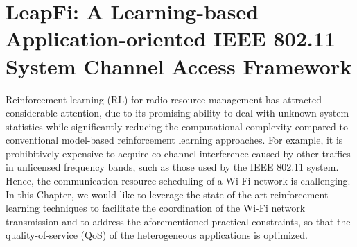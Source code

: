 \chapter{LeapFi: A Learning-based Application-oriented IEEE 802.11 System Channel Access Framework}
\label{ch3_after}


Reinforcement learning (RL) for radio resource management has attracted considerable attention, due to its promising ability to deal with unknown system statistics while significantly reducing the computational complexity compared to conventional model-based reinforcement learning approaches.
For example, it is prohibitively expensive to acquire co-channel interference caused by other traffics in unlicensed frequency bands, such as those used by the IEEE 802.11 system.
Hence, the communication resource scheduling of a Wi-Fi network is challenging.
In this Chapter, we would like to leverage the state-of-the-art reinforcement learning techniques to facilitate the coordination of the Wi-Fi network transmission and to address the aforementioned practical constraints, so that the quality-of-service (QoS) of the heterogeneous applications is optimized.

